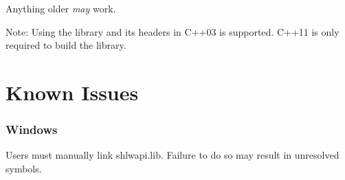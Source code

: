 Anything older {\itshape may} work.

Note\+: Using the library and its headers in C++03 is supported. C++11 is only required to build the library.

\section*{Known Issues}

\subsubsection*{Windows}


\begin{DoxyItemize}
\item Users must manually link {\ttfamily shlwapi.\+lib}. Failure to do so may result in unresolved symbols. 
\end{DoxyItemize}